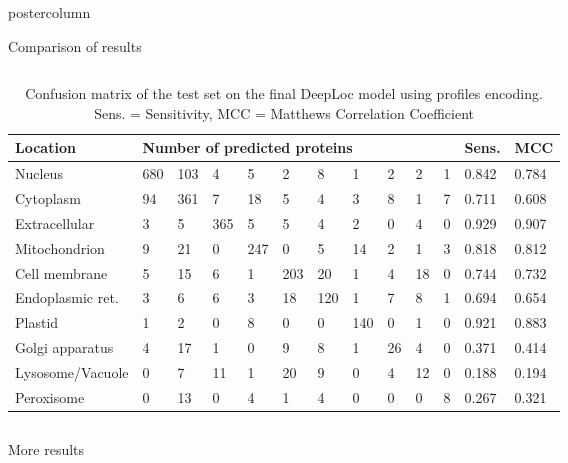 \documentclass[final,hyperref={pdfpagelabels=false}]{beamer}
\begin{document}
\begin{frame}
\begin{columns}
\begin{column}{.49\paperwidth}
\begin{beamercolorbox}[center,wd=\textwidth]{postercolumn}
\begin{minipage}[T]{.99\textwidth}
{\begin{block}{Comparison of results}
\begin{columns}
\begin{column}{1\textwidth}
\begin{minipage}[t]{.95\textwidth}
\vspace{-1cm}
\begin{table}[h]
\small
\caption{Confusion matrix of the test set on the final DeepLoc model using profiles encoding. Sens. = Sensitivity, MCC = Matthews Correlation Coefficient}
\begin{tabular}{p{8cm}p{2cm}p{2cm}p{2cm}p{2cm}p{2cm}p{2cm}p{2cm}p{2cm}p{2cm}p{2cm}p{2.5cm}p{2.5cm}}
\toprule
Location      & \multicolumn{10}{l}{Number of predicted proteins}        & Sens. & MCC \\
\midrule
Nucleus          & 680 & 103 & 4   & 5   & 2   & 8   & 1   & 2  & 2 & 1 & 0.842 & 0.784 \\
Cytoplasm         & 94  & 361 &  7  & 18  & 5   & 4   & 3   & 8  & 1 & 7 & 0.711 & 0.608 \\
Extracellular    & 3   & 5   & 365 &  5  & 5   & 4   & 2   & 0  & 4 & 0 & 0.929 & 0.907 \\
Mitochondrion     & 9   & 21  & 0   & 247 &  0  & 5   & 14  & 2  & 1 & 3 & 0.818 & 0.812 \\
Cell membrane     & 5   & 15  & 6   & 1   & 203 & 20  & 1   & 4  & 18& 0 & 0.744 & 0.732 \\
Endoplasmic ret.               & 3   & 6   & 6   & 3   & 18  & 120 &  1  & 7  & 8 & 1 & 0.694 & 0.654 \\
Plastid           & 1   & 2   & 0   & 8   & 0   & 0   & 140 &  0 & 1 & 0 & 0.921 & 0.883 \\
Golgi apparatus  & 4   & 17  & 1   & 0   & 9   & 8   & 1   & 26 & 4 & 0 & 0.371 & 0.414 \\
Lysosome/Vacuole & 0   & 7   & 11  & 1   & 20  & 9   & 0   & 4  & 12& 0 & 0.188 & 0.194 \\
Peroxisome       & 0   & 13  & 0   & 4   & 1   & 4   & 0   & 0  & 0 & 8 & 0.267 & 0.321 \\
\bottomrule

\end{tabular}
\end{table}


\end{minipage}

\end{column}
\end{columns}
\end{block}

\vfill

\begin{block}{More results}

\begin{columns}
\begin{column}{1\textwidth}


\end{column}
\end{columns}
\end{block}}
\end{minipage}
\end{beamercolorbox}
\end{column}
\end{columns}
\end{frame}
\end{document}
